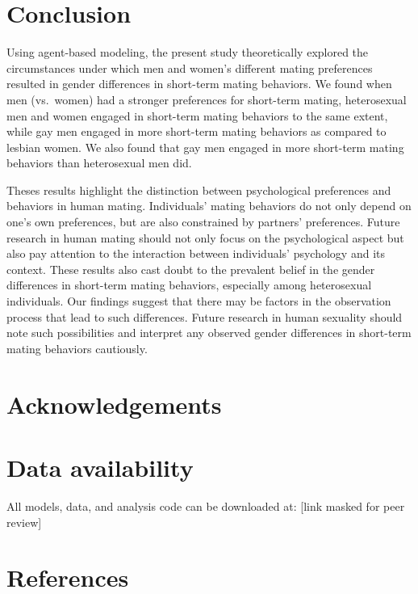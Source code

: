\documentclass[
  11pt,
]{article}
\begin{document}
\hypertarget{conclusion}{%
\section{Conclusion}\label{conclusion}}

Using agent-based modeling, the present study theoretically explored the
circumstances under which men and women's different mating preferences
resulted in gender differences in short-term mating behaviors. We found
when men (vs.~women) had a stronger preferences for short-term mating,
heterosexual men and women engaged in short-term mating behaviors to the
same extent, while gay men engaged in more short-term mating behaviors
as compared to lesbian women. We also found that gay men engaged in more
short-term mating behaviors than heterosexual men did.

Theses results highlight the distinction between psychological
preferences and behaviors in human mating. Individuals' mating behaviors
do not only depend on one's own preferences, but are also constrained by
partners' preferences. Future research in human mating should not only
focus on the psychological aspect but also pay attention to the
interaction between individuals' psychology and its context. These
results also cast doubt to the prevalent belief in the gender
differences in short-term mating behaviors, especially among
heterosexual individuals. Our findings suggest that there may be factors
in the observation process that lead to such differences. Future
research in human sexuality should note such possibilities and interpret
any observed gender differences in short-term mating behaviors
cautiously.

\hypertarget{acknowledgements}{%
\section{Acknowledgements}\label{acknowledgements}}

\hypertarget{data-availability}{%
\section{Data availability}\label{data-availability}}

All models, data, and analysis code can be downloaded at: {[}link masked
for peer review{]}

\newpage

\hypertarget{references}{%
\section*{References}\label{references}}
\end{document}
